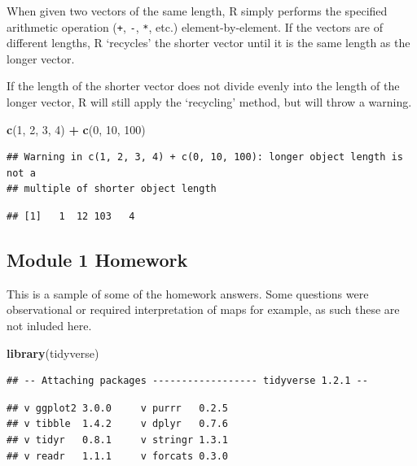 \documentclass[]{book}
\newenvironment{Shaded}{\begin{snugshade}}{\end{snugshade}}
\newcommand{\KeywordTok}[1]{\textcolor[rgb]{0.13,0.29,0.53}{\textbf{#1}}}
\newcommand{\DecValTok}[1]{\textcolor[rgb]{0.00,0.00,0.81}{#1}}
\newcommand{\StringTok}[1]{\textcolor[rgb]{0.31,0.60,0.02}{#1}}
\newcommand{\OperatorTok}[1]{\textcolor[rgb]{0.81,0.36,0.00}{\textbf{#1}}}
\newcommand{\NormalTok}[1]{#1}
\theoremstyle{definition}
\theoremstyle{definition}
\theoremstyle{definition}
\theoremstyle{remark}
\begin{document}
When given two vectors of the same length, R simply performs the
specified arithmetic operation (\texttt{+}, \texttt{-}, \texttt{*},
etc.) element-by-element. If the vectors are of different lengths, R
`recycles' the shorter vector until it is the same length as the longer
vector.

If the length of the shorter vector does not divide evenly into the
length of the longer vector, R will still apply the `recycling' method,
but will throw a warning.

\begin{Shaded}
\begin{Highlighting}[]
\KeywordTok{c}\NormalTok{(}\DecValTok{1}\NormalTok{, }\DecValTok{2}\NormalTok{, }\DecValTok{3}\NormalTok{, }\DecValTok{4}\NormalTok{) }\OperatorTok{+}\StringTok{ }\KeywordTok{c}\NormalTok{(}\DecValTok{0}\NormalTok{, }\DecValTok{10}\NormalTok{, }\DecValTok{100}\NormalTok{)}
\end{Highlighting}
\end{Shaded}

\begin{verbatim}
## Warning in c(1, 2, 3, 4) + c(0, 10, 100): longer object length is not a
## multiple of shorter object length
\end{verbatim}

\begin{verbatim}
## [1]   1  12 103   4
\end{verbatim}

\subsection{Module 1 Homework}\label{module-1-homework}

This is a sample of some of the homework answers. Some questions were
observational or required interpretation of maps for example, as such
these are not inluded here.

\begin{Shaded}
\begin{Highlighting}[]
\KeywordTok{library}\NormalTok{(tidyverse)}
\end{Highlighting}
\end{Shaded}

\begin{verbatim}
## -- Attaching packages ------------------ tidyverse 1.2.1 --
\end{verbatim}

\begin{verbatim}
## v ggplot2 3.0.0     v purrr   0.2.5
## v tibble  1.4.2     v dplyr   0.7.6
## v tidyr   0.8.1     v stringr 1.3.1
## v readr   1.1.1     v forcats 0.3.0
\end{verbatim}
\end{document}
